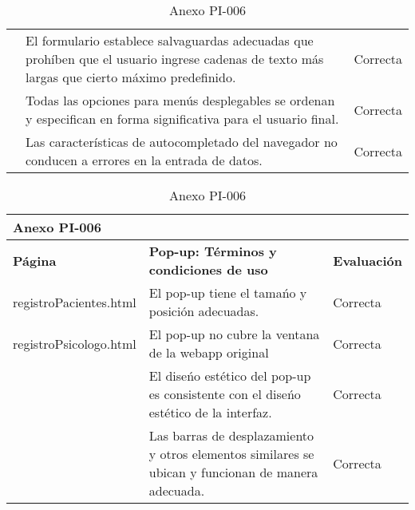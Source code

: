 \begin{table}[htpb]
\begin{tabularx}{\textwidth}{|l|X|l|}
                                          & El formulario establece salvaguardas adecuadas que prohíben que el usuario ingrese cadenas de texto más largas que cierto máximo predefinido.             & Correcta            \\ \cline{2-3} 
                                          & Todas las opciones para menús desplegables se ordenan y especifican en forma significativa para el usuario final.                                         & Correcta            \\ \cline{2-3} 
                                          & Las características de autocompletado del navegador no conducen a errores en la entrada de datos.                                                         & Correcta            \\ \hline
\end{tabularx}
\caption{Anexo PI-006}
\end{table}


\begin{table}[htpb]
\centering
\begin{tabularx}{\textwidth}{|l|X|l|}
\hline
\multicolumn{3}{|l|}{\textbf{Anexo PI-006}}                                                                                                                                                  \\ \hline
\textbf{Página}                                                  & \textbf{Pop-up: Términos y condiciones de uso}                                                     & \textbf{Evaluación} \\ \hline
registroPacientes.html & El pop-up tiene el tamańo y posición adecuadas.                                                    & Correcta            \\ \cline{2-3} 
registroPsicologo.html                                                                 & El pop-up no cubre la ventana de la webapp original                                                & Correcta            \\ \cline{2-3} 
                                                                 & El diseńo estético del pop-up es consistente con el diseńo estético de la interfaz.                & Correcta            \\ \cline{2-3} 
                                                                 & Las barras de desplazamiento y otros elementos similares se ubican y funcionan de manera adecuada. & Correcta            \\ \hline
\end{tabularx}
\caption{Anexo PI-006}
\end{table}


